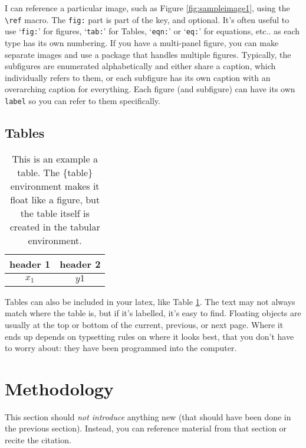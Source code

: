 \documentclass[12pt]{article}
\begin{document}
I can reference a particular image, such as Figure \ref{fig:sampleimage1}, using the \verb|\ref| macro. The \texttt{fig:} part is part of the key, and optional. It's often useful to use `\texttt{fig:}' for figures, `\texttt{tab:}' for Tables, `\texttt{eqn:}' or `\texttt{eq:}' for equations, etc.. as each type has its own numbering. If you have a multi-panel figure, you can make separate images and use a package that handles multiple figures. Typically, the subfigures are enumerated alphabetically and either share a caption, which individually refers to them, or each subfigure has its own caption with an overarching caption for everything. Each figure (and subfigure) can have its own \texttt{label} so you can refer to them specifically.


\subsection {Tables}
	 
\begin{table}
	\centering
		\caption{\label{tab:sampletable1} This is an example a table. The \{table\} environment makes it float like a figure, but the table itself is created in the tabular environment.  }
	\begin{tabular}{|c| c|}
		\hline
		header 1 & header 2 \\
		\hline
		$x_1$ & $y1$\\
		\hline
	\end{tabular}
\end{table}
Tables can also be included in your latex, like Table \ref{tab:sampletable1}. The text may not always match where the table is, but if it's labelled, it's easy to find. Floating objects are usually at the top or bottom of the current, previous, or next page. Where it ends up depends on typsetting rules on where it looks best, that you don't have to worry about: they have been programmed into the computer.

	\section{Methodology}
	This section should \emph{not introduce} anything new (that should have been done in the previous section). Instead, you can reference material from that section or recite the citation. 
\end{document}
